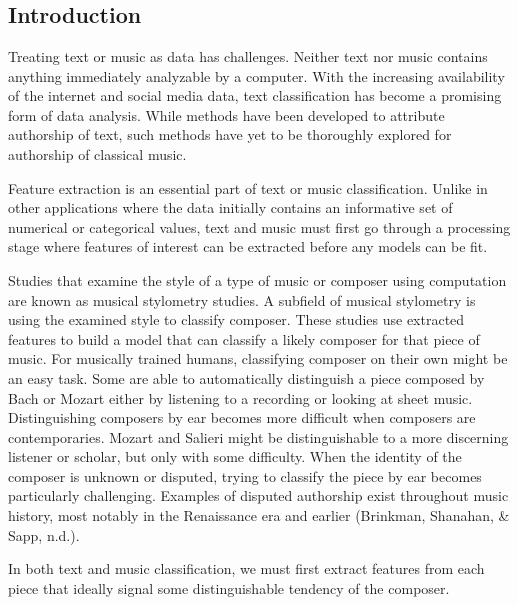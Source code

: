 \documentclass[12pt,twoside]{reedthesis}
\theoremstyle{definition}
\theoremstyle{definition}
\theoremstyle{definition}
\theoremstyle{remark}
\begin{document}
\mainmatter %
\pagestyle{fancyplain} %

\chapter{}\label{section}

\section{Introduction}\label{introduction}

Treating text or music as data has challenges. Neither text nor music
contains anything immediately analyzable by a computer. With the
increasing availability of the internet and social media data, text
classification has become a promising form of data analysis. While
methods have been developed to attribute authorship of text, such
methods have yet to be thoroughly explored for authorship of classical
music.

Feature extraction is an essential part of text or music classification.
Unlike in other applications where the data initially contains an
informative set of numerical or categorical values, text and music must
first go through a processing stage where features of interest can be
extracted before any models can be fit.

Studies that examine the style of a type of music or composer using
computation are known as musical stylometry studies. A subfield of
musical stylometry is using the examined style to classify composer.
These studies use extracted features to build a model that can classify
a likely composer for that piece of music. For musically trained humans,
classifying composer on their own might be an easy task. Some are able
to automatically distinguish a piece composed by Bach or Mozart either
by listening to a recording or looking at sheet music. Distinguishing
composers by ear becomes more difficult when composers are
contemporaries. Mozart and Salieri might be distinguishable to a more
discerning listener or scholar, but only with some difficulty. When the
identity of the composer is unknown or disputed, trying to classify the
piece by ear becomes particularly challenging. Examples of disputed
authorship exist throughout music history, most notably in the
Renaissance era and earlier (Brinkman, Shanahan, \& Sapp, n.d.).

In both text and music classification, we must first extract features
from each piece that ideally signal some distinguishable tendency of the
composer.
\end{document}
